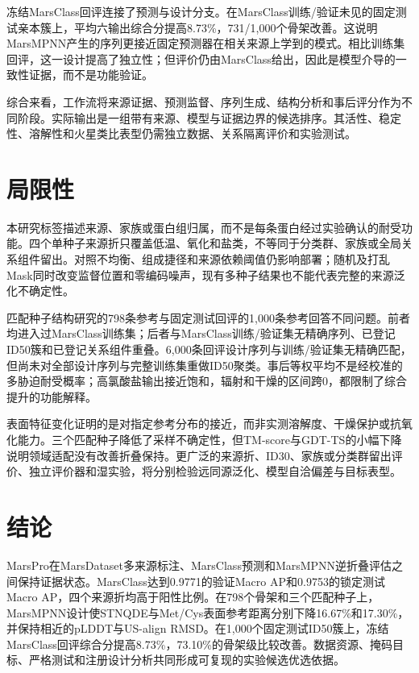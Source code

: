 \documentclass[conference]{IEEEtran}
\begin{document}
冻结MarsClass回评连接了预测与设计分支。在MarsClass训练/验证未见的固定测试亲本簇上，平均六输出综合分提高8.73\%，731/1,000个骨架改善。这说明MarsMPNN产生的序列更接近固定预测器在相关来源上学到的模式。相比训练集回评，这一设计提高了独立性；但评价仍由MarsClass给出，因此是模型介导的一致性证据，而不是功能验证。

综合来看，工作流将来源证据、预测监督、序列生成、结构分析和事后评分作为不同阶段。实际输出是一组带有来源、模型与证据边界的候选排序。其活性、稳定性、溶解性和火星类比表型仍需独立数据、关系隔离评价和实验测试。

\section{局限性}

本研究标签描述来源、家族或蛋白组归属，而不是每条蛋白经过实验确认的耐受功能。四个单种子来源折只覆盖低温、氧化和盐类，不等同于分类群、家族或全局关系组件留出。对照不均衡、组成捷径和来源依赖阈值仍影响部署；随机及打乱Mask同时改变监督位置和零编码噪声，现有多种子结果也不能代表完整的来源泛化不确定性。

匹配种子结构研究的798条参考与固定测试回评的1,000条参考回答不同问题。前者均进入过MarsClass训练集；后者与MarsClass训练/验证集无精确序列、已登记ID50簇和已登记关系组件重叠。6,000条回评设计序列与训练/验证集无精确匹配，但尚未对全部设计序列与完整训练集重做ID50聚类。事后等权平均不是经校准的多胁迫耐受概率；高氯酸盐输出接近饱和，辐射和干燥的区间跨0，都限制了综合提升的功能解释。

表面特征变化证明的是对指定参考分布的接近，而非实测溶解度、干燥保护或抗氧化能力。三个匹配种子降低了采样不确定性，但TM-score与GDT-TS的小幅下降说明领域适配没有改善折叠保持。更广泛的来源折、ID30、家族或分类群留出评价、独立评价器和湿实验，将分别检验远同源泛化、模型自洽偏差与目标表型。

\section{结论}\label{sec:conclusion}

MarsPro在MarsDataset多来源标注、MarsClass预测和MarsMPNN逆折叠评估之间保持证据状态。MarsClass达到0.9771的验证Macro AP和0.9753的锁定测试Macro AP，四个来源折均高于阳性比例。在798个骨架和三个匹配种子上，MarsMPNN设计使STNQDE与Met/Cys表面参考距离分别下降16.67\%和17.30\%，并保持相近的pLDDT与US-align RMSD。在1,000个固定测试ID50簇上，冻结MarsClass回评综合分提高8.73\%，73.10\%的骨架级比较改善。数据资源、掩码目标、严格测试和注册设计分析共同形成可复现的实验候选优选依据。
\end{document}

